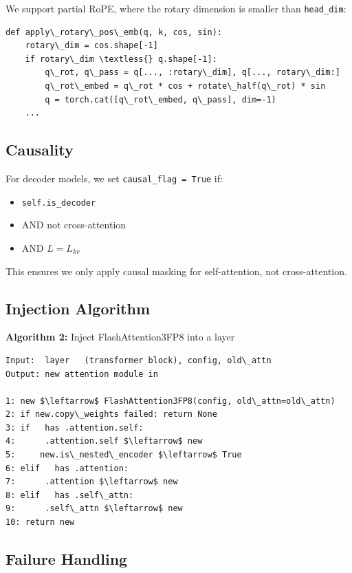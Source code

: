 We support partial RoPE, where the rotary dimension is smaller than 
\texttt{head\_dim}:

\begin{lstlisting}
def apply\_rotary\_pos\_emb(q, k, cos, sin):
    rotary\_dim = cos.shape[-1]
    if rotary\_dim \textless{} q.shape[-1]:
        q\_rot, q\_pass = q[..., :rotary\_dim], q[..., rotary\_dim:]
        q\_rot\_embed = q\_rot * cos + rotate\_half(q\_rot) * sin
        q = torch.cat([q\_rot\_embed, q\_pass], dim=-1)
    ...
\end{lstlisting}

\subsection{Causality}

For decoder models, we set \texttt{causal\_flag = True} if:
\begin{itemize}
\item \texttt{self.is\_decoder}
\item AND not cross-attention
\item AND $L = L_{kv}$

\end{itemize}
This ensures we only apply causal masking for self-attention, not 
cross-attention.

\subsection{Injection Algorithm}

\textbf{Algorithm 2:} Inject FlashAttention3FP8 into a layer
\begin{lstlisting}
Input:  layer   (transformer block), config, old\_attn
Output: new attention module in  

1: new $\leftarrow$ FlashAttention3FP8(config, old\_attn=old\_attn)
2: if new.copy\_weights failed: return None
3: if   has .attention.self:
4:      .attention.self $\leftarrow$ new
5:     new.is\_nested\_encoder $\leftarrow$ True
6: elif   has .attention:
7:      .attention $\leftarrow$ new
8: elif   has .self\_attn:
9:      .self\_attn $\leftarrow$ new
10: return new
\end{lstlisting}

\subsection{Failure Handling}


